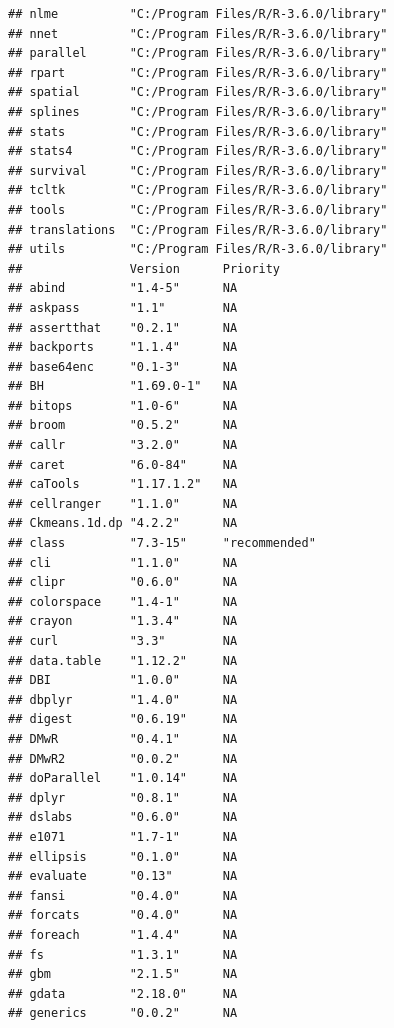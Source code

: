 \documentclass[]{article}
\begin{document}
\begin{verbatim}
## nlme          "C:/Program Files/R/R-3.6.0/library"                 
## nnet          "C:/Program Files/R/R-3.6.0/library"                 
## parallel      "C:/Program Files/R/R-3.6.0/library"                 
## rpart         "C:/Program Files/R/R-3.6.0/library"                 
## spatial       "C:/Program Files/R/R-3.6.0/library"                 
## splines       "C:/Program Files/R/R-3.6.0/library"                 
## stats         "C:/Program Files/R/R-3.6.0/library"                 
## stats4        "C:/Program Files/R/R-3.6.0/library"                 
## survival      "C:/Program Files/R/R-3.6.0/library"                 
## tcltk         "C:/Program Files/R/R-3.6.0/library"                 
## tools         "C:/Program Files/R/R-3.6.0/library"                 
## translations  "C:/Program Files/R/R-3.6.0/library"                 
## utils         "C:/Program Files/R/R-3.6.0/library"                 
##               Version      Priority     
## abind         "1.4-5"      NA           
## askpass       "1.1"        NA           
## assertthat    "0.2.1"      NA           
## backports     "1.1.4"      NA           
## base64enc     "0.1-3"      NA           
## BH            "1.69.0-1"   NA           
## bitops        "1.0-6"      NA           
## broom         "0.5.2"      NA           
## callr         "3.2.0"      NA           
## caret         "6.0-84"     NA           
## caTools       "1.17.1.2"   NA           
## cellranger    "1.1.0"      NA           
## Ckmeans.1d.dp "4.2.2"      NA           
## class         "7.3-15"     "recommended"
## cli           "1.1.0"      NA           
## clipr         "0.6.0"      NA           
## colorspace    "1.4-1"      NA           
## crayon        "1.3.4"      NA           
## curl          "3.3"        NA           
## data.table    "1.12.2"     NA           
## DBI           "1.0.0"      NA           
## dbplyr        "1.4.0"      NA           
## digest        "0.6.19"     NA           
## DMwR          "0.4.1"      NA           
## DMwR2         "0.0.2"      NA           
## doParallel    "1.0.14"     NA           
## dplyr         "0.8.1"      NA           
## dslabs        "0.6.0"      NA           
## e1071         "1.7-1"      NA           
## ellipsis      "0.1.0"      NA           
## evaluate      "0.13"       NA           
## fansi         "0.4.0"      NA           
## forcats       "0.4.0"      NA           
## foreach       "1.4.4"      NA           
## fs            "1.3.1"      NA           
## gbm           "2.1.5"      NA           
## gdata         "2.18.0"     NA           
## generics      "0.0.2"      NA           

\end{verbatim}
\end{document}
